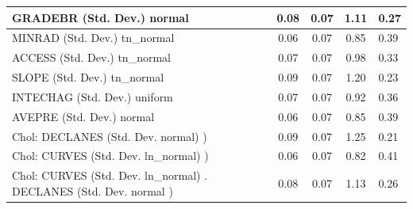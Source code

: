 \begin{table}
\begin{center}
\begin{tabular}{|l|l|c|c|c|l|}
			\hline
			GRADEBR (Std. Dev.) normal &  & 0.08 & 0.07 & 1.11 & 0.27 \\
			\hline
			MINRAD (Std. Dev.) tn_normal &  & 0.06 & 0.07 & 0.85 & 0.39 \\
			\hline
			ACCESS (Std. Dev.) tn_normal &  & 0.07 & 0.07 & 0.98 & 0.33 \\
			\hline
			SLOPE (Std. Dev.) tn_normal &  & 0.09 & 0.07 & 1.20 & 0.23 \\
			\hline
			INTECHAG (Std. Dev.) uniform &  & 0.07 & 0.07 & 0.92 & 0.36 \\
			\hline
			AVEPRE (Std. Dev.) normal &  & 0.06 & 0.07 & 0.85 & 0.39 \\
			\hline
			 Chol: DECLANES (Std. Dev. normal) ) &  & 0.09 & 0.07 & 1.25 & 0.21 \\
			\hline
			 Chol: CURVES (Std. Dev. ln_normal) ) &  & 0.06 & 0.07 & 0.82 & 0.41 \\
			\hline
			 Chol: CURVES (Std. Dev. ln_normal) . DECLANES (Std. Dev.   normal ) &  & 0.08 & 0.07 & 1.13 & 0.26 \\
			\hline
		\end{tabular}
	\end{center}
\end{table}